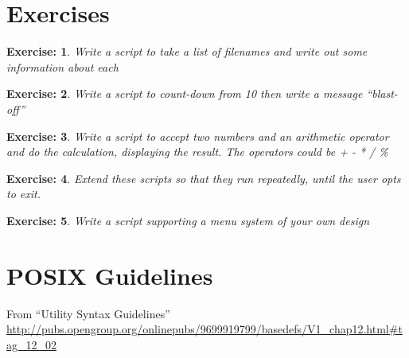 \documentclass{article}
\newtheorem{exercise}{Exercise:}
\begin{document}
\section{Exercises}
\begin{exercise}
  Write a script to take a list of filenames and write out some
  information about each
\end{exercise}

\begin{exercise}
Write a script to count-down from
10 then write a message ``blast-off''
\end{exercise}

\begin{exercise}
  Write a script to accept two numbers and an arithmetic operator and
  do the calculation, displaying the result. The operators could be +
  - * / \%
\end{exercise}

\begin{exercise}
  Extend these scripts so that they run repeatedly, until the user
  opts to exit.
\end{exercise}

\begin{exercise}
  Write a script supporting a menu system of your own design
\end{exercise}


\clearpage\appendix
\section{POSIX Guidelines}
From ``Utility Syntax Guidelines''
\url{http://pubs.opengroup.org/onlinepubs/9699919799/basedefs/V1_chap12.html#tag_12_02}
\end{document}
